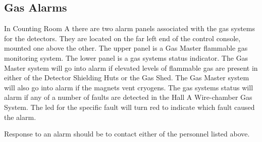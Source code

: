 \subsection{Gas Alarms}

In Counting Room A there are two alarm panels associated with the gas
systems for the detectors.  They are located on the far left end of the
control console, mounted one above the other.  The upper panel is a
Gas Master flammable gas monitoring system.  The lower panel is a gas
systems status indicator.  The Gas Master system will go into alarm if
elevated levels of flammable gas are present in either of the Detector
Shielding Huts or the Gas Shed.  The Gas Master system will also go into
alarm if the magnets vent cryogens.  The gas systems status will
alarm if any of a number of faults are detected in the Hall A Wire-chamber
Gas System.  The led for the specific fault will turn red to indicate which
fault caused the alarm.

Response to an alarm should be to contact either of the personnel listed above.
%
